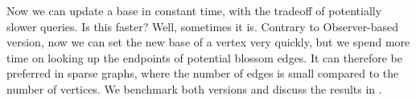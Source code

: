 Now we can update a base in constant time, with the tradeoff of potentially slower queries. Is this faster? Well, sometimes it is. Contrary to Observer-based version, now we can set the new base of a vertex very quickly, but we spend more time on looking up the endpoints of potential blossom edges. It can therefore be preferred in sparse graphs, where the number of edges is small compared to the number of vertices. We benchmark both versions and discuss the results in .
